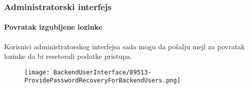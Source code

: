 
\begin{frame}[fragile]
	\frametitle{Administratorski interfejs}
	\framesubtitle{Povratak izgubljene lozinke}

	Korisnici administratorskog interfejsa sada mogu da pošalju mejl za povratak lozinke
	da bi resetovali podatke pristupa.

	\begin{figure}
		\texttt{[image: BackendUserInterface/89513-ProvidePasswordRecoveryForBackendUsers.png]}
	\end{figure}

\end{frame}


